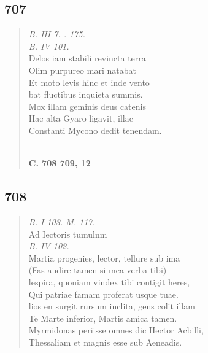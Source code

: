 \documentclass[11pt, a4paper]{report}
\begin{document}
            \subsection*{707}
      \begin{verse}
      \textit{B. III 7. . 175.} \\ \textit{B. IV 101.} \\ Delos iam stabili revincta terra \\ Olim purpureo mari natabat \\ Et moto levis hinc et inde vento \\ bat fluctibus inquieta summis. \\ Mox illam geminis deus catenis \\ Hac alta Gyaro ligavit, illac \\ Constanti Mycono dedit tenendam. \\ 
        ﻿\pagebreak 
     \marginpar{[174]} \begin{center} \textbf{C. 708 709, 12} \end{center}
      \end{verse}
  
            \subsection*{708}
      \begin{verse}
      \textit{B. I 103. M. 117.} \\ Ad Iectoris tumulnm \\ \textit{B. IV 102.} \\ Martia progenies, lector, tellure sub ima \\ (Fas audire tamen si mea verba tibi) \\ lespira, quouiam vindex tibi contigit heres, \\ Qui patriae famam proferat usque tuae. \\ lios en surgit rursum inclita, gens colit illam \\ Te Marte inferior, Martis amica tamen. \\ Myrmidonas periisse omnes dic Hector Acbilli, \\ Thessaliam et magnis esse sub Aeneadis. \\ 
      \end{verse}
  
\end{document}
